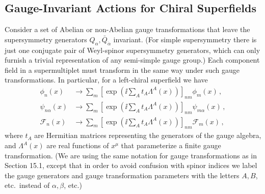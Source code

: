 
\subsection{Gauge-Invariant Actions for Chiral Superfields}

Consider a set of Abelian or non-Abelian gauge transformations that leave
the supersymmetry generators \(Q_\alpha,\bar Q_{\dot\alpha}\) invariant.
(For simple supersymmetry there is just one conjugate pair of Weyl-spinor
supersymmetry generators, which can only
furnish a trivial representation of any semi-simple gauge group.) Each
component field in a supermultiplet must transform in the same way under
such gauge transformations. In particular, for a left-chiral superfield we
have
\begin{equation}
  \begin{aligned}
  \phi_n(x)&\longrightarrow
    \sum_m\left[
      \exp\left(\ii\sum_A t_A\Lambda^A(x)\right)
    \right]_{nm}\phi_m(x)\,,
  \\
  \psi_{n\alpha}(x)&\longrightarrow
    \sum_m\left[
      \exp\left(\ii\sum_A t_A\Lambda^A(x)\right)
    \right]_{nm}\psi_{m\alpha}(x)\,,
  \\
  \mathcal{F}_n(x)&\longrightarrow
    \sum_m\left[
      \exp\left(\ii\sum_A t_A\Lambda^A(x)\right)
    \right]_{nm}\mathcal{F}_m(x)\,,
  \end{aligned}
  \tag{27.1.1}\label{eq:27.1.1}
\end{equation}
where \(t_A\) are Hermitian matrices representing the generators of the
gauge algebra, and \(\Lambda^A(x)\) are real functions of \(x^\mu\) that
parameterize a finite gauge transformation. (We are using the same notation
for gauge transformations as in Section 15.1, except that in order to avoid
confusion with spinor indices we label the gauge generators and gauge
transformation parameters with the letters \(A,B\), etc.\ instead of
\(\alpha,\beta\), etc.)

